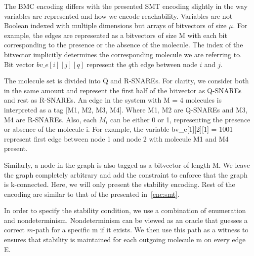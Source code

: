 The BMC encoding differs with the presented SMT encoding slightly in the way variables are represented and how we encode reachability.  
%
Variables are not Boolean indexed with multiple dimensions but arrays of bitvectors of size $\mu$. 
%
%
For example, the edges are represented as a bitvectors of size M with each bit corresponding to the presence or the absence of the molecule. 
%
The index of the bitvector implicitly determines the corresponding molecule we are referring to.
%
Bit vector $bv\_e[i][j][q]$ represent the $q$th edge between node $i$ and $j$.
% 

The molecule set is divided into Q and R-SNAREs. 
%
For clarity, we consider both in the same amount and represent the first half of the bitvector as  Q-SNAREs and rest as R-SNAREs.
%
An edge in the system with M = 4 molecules is interpreted as a tag [M1, M2, M3, M4]. 
%
Where M1, M2 are Q-SNAREs and M3, M4 are R-SNAREs.
%
Also, each $M_i$ can be either 0 or 1, representing the presence or absence of the molecule i.
%
For example, the variable bv\_e[1][2][1] = 1001 represent first edge between node 1 and node 2 with molecule M1 and M4 present. 

Similarly, a node in the graph is also tagged as a bitvector of length M.   
%
We leave the graph completely arbitrary and add the constraint to enforce that the graph is k-connected. 
%
Here, we will only present the stability encoding.  
%
Rest of the encoding are similar to that of the presented in~\ref{enc:smt}.

In order to specify the stability condition, we use a combination of enumeration and nondeterminism.
%
Nondeterminism can be viewed as an oracle that guesses a correct $m$-path for a specific m if it exists. 
%
We then use this path as a witness to ensures that stability is maintained for each outgoing molecule m on every edge E.
%

